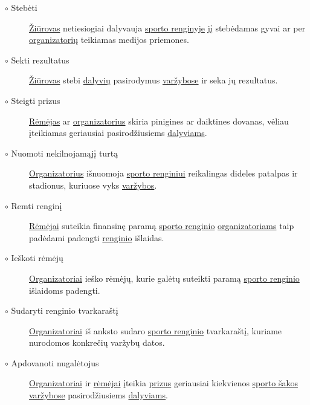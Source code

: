 \documentclass{VUMIFPSkursinis}
\begin{document}
\begin{itemize}
\begin{description}
            \item [$\circ$ Stebėti] \underline{Žiūrovas} netiesiogiai dalyvauja \underline{sporto renginyje} jį stebėdamas gyvai ar per \underline{organizatorių} teikiamas medijos priemones.
            \item [$\circ$ Sekti rezultatus] \underline{Žiūrovas} stebi \underline{dalyvių} pasirodymus \underline{varžybose} ir seka jų rezultatus.
            \item [$\circ$ Steigti prizus] \underline{Rėmėjas} ar \underline{organizatorius} skiria pinigines ar daiktines dovanas, vėliau įteikiamas geriausiai pasirodžiusiems \underline{dalyviams}.
            \item [$\circ$ Nuomoti nekilnojamąjį turtą] \underline{Organizatorius} išnuomoja \underline{sporto renginiui} reikalingas dideles patalpas ir stadionus, kuriuose vyks \underline{varžybos}.
            \item [$\circ$ Remti renginį] \underline{Rėmėjai} suteikia finansinę paramą \underline{sporto renginio} \underline{organizatoriams} taip padėdami padengti \underline{renginio} išlaidas.
            \item [$\circ$ Ieškoti rėmėjų] \underline{Organizatoriai} ieško rėmėjų, kurie galėtų suteikti paramą \underline{sporto renginio} išlaidoms padengti.
            \item [$\circ$ Sudaryti renginio tvarkaraštį] \underline{Organizatoriai} iš anksto sudaro \underline{sporto renginio} tvarkaraštį, kuriame nurodomos konkrečių varžybų datos.
            \item [$\circ$ Apdovanoti nugalėtojus] \underline{Organizatoriai} ir \underline{rėmėjai} įteikia \underline{prizus} geriausiai kiekvienos \underline{sporto šakos} \underline{varžybose} pasirodžiusiems \underline{dalyviams}.
          \end{description}
      \end{itemize}
\end{document}

